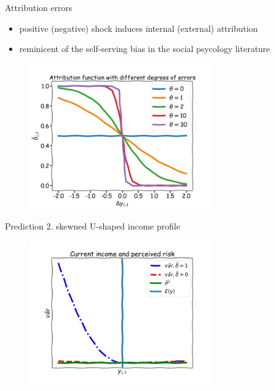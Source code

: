 \documentclass{beamer}
\begin{document}
\begin{frame}{Attribution errors}
	\begin{itemize}
		\item positive (negative) shock induces internal (external) attribution
		\item reminicent of the self-serving bias in the social psycology literature  
	\end{itemize}

		\begin{figure}
			\centering 
			\label{var_experience_var}
			\includegraphics[width=0.7\textwidth]{figures/theta_corr.jpg}
		\end{figure}
\end{frame}


\begin{frame}{Prediction 2. skewned U-shaped income profile}
		\begin{figure}
		\centering 
		\label{var_experience_var}
		\includegraphics[width=0.7\textwidth]{figures/var_recent.jpg}
	\end{figure}
\end{frame}
\end{document}
